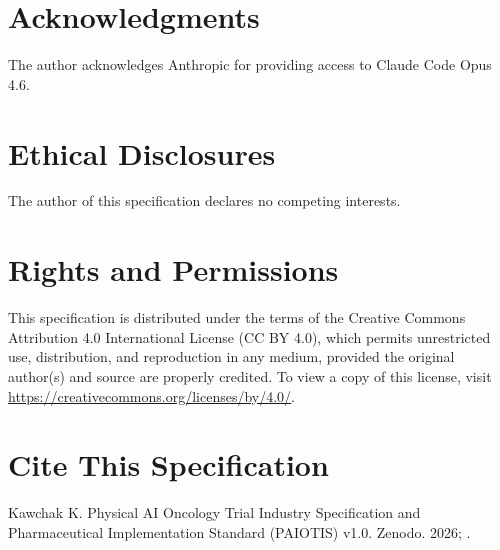 \documentclass[11pt,letterpaper]{article}
\begin{document}




\section*{Acknowledgments}
The author acknowledges Anthropic for providing access to Claude Code Opus 4.6.

\section*{Ethical Disclosures}
The author of this specification declares no competing interests.

\section*{Rights and Permissions}
This specification is distributed under the terms of the Creative Commons Attribution 4.0 International License (CC BY 4.0), which permits unrestricted use, distribution, and reproduction in any medium, provided the original author(s) and source are properly credited. To view a copy of this license, visit \url{https://creativecommons.org/licenses/by/4.0/}.

\section*{Cite This Specification}
Kawchak K. Physical AI Oncology Trial Industry Specification and Pharmaceutical Implementation Standard (PAIOTIS) v1.0. Zenodo. 2026; .
\end{document}
